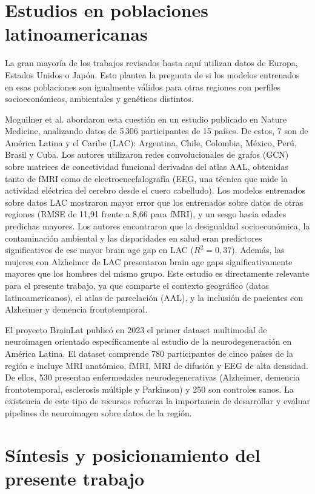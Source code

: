 \section{Estudios en poblaciones latinoamericanas}

La gran mayoría de los trabajos revisados hasta aquí utilizan datos de Europa, Estados Unidos o Japón. Esto plantea la pregunta de si los modelos entrenados en esas poblaciones son igualmente válidos para otras regiones con perfiles socioeconómicos, ambientales y genéticos distintos.

Moguilner et al. \cite{moguilner2024brain} abordaron esta cuestión en un estudio publicado en Nature Medicine, analizando datos de 5\,306 participantes de 15 países. De estos, 7 son de América Latina y el Caribe (LAC): Argentina, Chile, Colombia, México, Perú, Brasil y Cuba. Los autores utilizaron redes convolucionales de grafos (GCN) sobre matrices de conectividad funcional derivadas del atlas AAL, obtenidas tanto de fMRI como de electroencefalografía (EEG, una técnica que mide la actividad eléctrica del cerebro desde el cuero cabelludo). Los modelos entrenados sobre datos LAC mostraron mayor error que los entrenados sobre datos de otras regiones (RMSE de 11,91 frente a 8,66 para fMRI), y un sesgo hacia edades predichas mayores. Los autores encontraron que la desigualdad socioeconómica, la contaminación ambiental y las disparidades en salud eran predictores significativos de ese mayor brain age gap en LAC ($R^2 = 0{,}37$). Además, las mujeres con Alzheimer de LAC presentaron brain age gaps significativamente mayores que los hombres del mismo grupo. Este estudio es directamente relevante para el presente trabajo, ya que comparte el contexto geográfico (datos latinoamericanos), el atlas de parcelación (AAL), y la inclusión de pacientes con Alzheimer y demencia frontotemporal.

El proyecto BrainLat \cite{brainlat2023} publicó en 2023 el primer dataset multimodal de neuroimagen orientado específicamente al estudio de la neurodegeneración en América Latina. El dataset comprende 780 participantes de cinco países de la región e incluye MRI anatómico, fMRI, MRI de difusión y EEG de alta densidad. De ellos, 530 presentan enfermedades neurodegenerativas (Alzheimer, demencia frontotemporal, esclerosis múltiple y Parkinson) y 250 son controles sanos. La existencia de este tipo de recursos refuerza la importancia de desarrollar y evaluar pipelines de neuroimagen sobre datos de la región.

\section{Síntesis y posicionamiento del presente trabajo}

